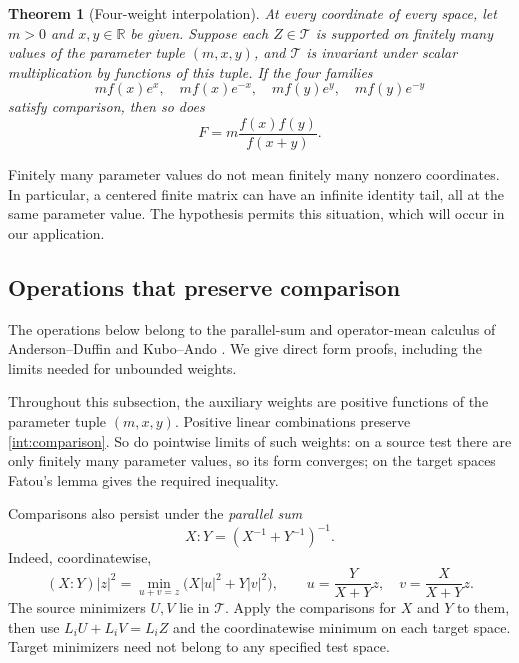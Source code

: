 \documentclass[11pt]{article}
\newcommand{\R}{\mathbb R}
\newtheorem{theorem}{Theorem}
\theoremstyle{remark}\newtheorem{remark}[theorem]{Remark}
\begin{document}
\begin{theorem}[Four-weight interpolation]\label{thm:interpolation}
At every coordinate of every space, let $m>0$ and $x,y\in\R$ be given.
Suppose each $Z\in\mathcal T$ is supported on finitely many values of the
parameter tuple $(m,x,y)$, and $\mathcal T$ is invariant under scalar
multiplication by functions of this tuple.  If the four families
\begin{equation}\label{int:four-weights}
 mf(x)e^x,\quad mf(x)e^{-x},\quad mf(y)e^y,\quad mf(y)e^{-y}
\end{equation}
satisfy comparison, then so does
\begin{equation}\label{int:target-weight}
 F=m\frac{f(x)f(y)}{f(x+y)}.
\end{equation}
\end{theorem}

Finitely many parameter values do not mean finitely many nonzero
coordinates.  In particular, a centered finite matrix can have an infinite
identity tail, all at the same parameter value.  The hypothesis permits
this situation, which will occur in our application.

\subsection{Operations that preserve comparison}\label{int:operations}

The operations below belong to the parallel-sum and operator-mean
calculus of Anderson--Duffin and Kubo--Ando
\cite{AndersonDuffin1969,KuboAndo1980}. We give direct form proofs,
including the limits needed for unbounded weights.

Throughout this subsection, the auxiliary weights are positive functions
of the parameter tuple $(m,x,y)$.
Positive linear combinations preserve \eqref{int:comparison}.  So do
pointwise limits of such weights: on a source test there are
only finitely many parameter values, so its form converges; on the target
spaces Fatou's lemma gives the required inequality.

Comparisons also persist under the \emph{parallel sum}
\begin{equation}\label{int:parallel}
 X:Y=(X^{-1}+Y^{-1})^{-1}.
\end{equation}
Indeed, coordinatewise,
\[
 (X:Y)|z|^2=\min_{u+v=z}\bigl(X|u|^2+Y|v|^2\bigr),
 \qquad
 u=\frac{Y}{X+Y}z,\quad v=\frac{X}{X+Y}z.
\]
The source minimizers $U,V$ lie in $\mathcal T$.  Apply the comparisons for
$X$ and $Y$ to them, then use $L_iU+L_iV=L_iZ$ and the coordinatewise
minimum on each target space.  Target minimizers need not belong to any
specified test space.
\end{document}
